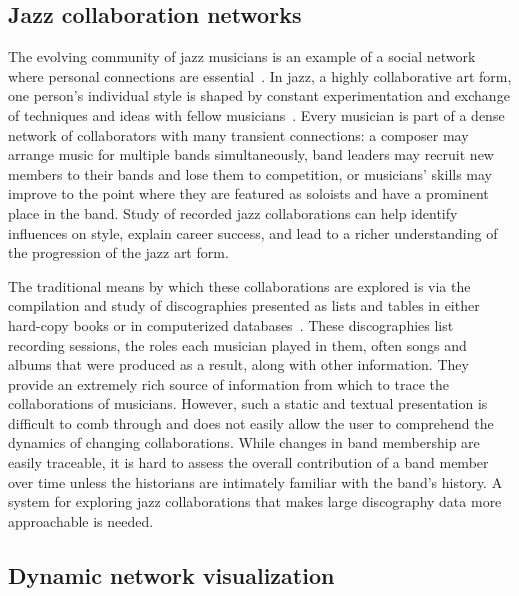 \documentclass[12pt]{cmuthesis}
\begin{document}
  \subsection{Jazz collaboration networks}

  The evolving community of jazz musicians is an example of a social network where personal connections are essential~\cite{Pinheiro2009}. In jazz, a highly collaborative art form, one person's individual style is shaped by constant experimentation and exchange of techniques and ideas with fellow musicians~\cite{Berliner1994}.  Every musician is part of a dense network of collaborators with many transient connections: a composer may arrange music for multiple bands simultaneously, band leaders may recruit new members to their bands and lose them to competition, or musicians' skills may improve to the point where they are featured as soloists and have a prominent place in the band. Study of recorded jazz collaborations can help identify influences on style, explain career success, and lead to a richer understanding of the progression of the jazz art form.

  The traditional means by which these collaborations are explored is via the compilation and study of discographies presented as lists and tables in either hard-copy books or in computerized databases~\cite{Timner2007,Albin}. These discographies list recording sessions, the roles each musician played in them, often songs and albums that were produced as a result, along with other information. They provide an extremely rich source of information from which to trace the collaborations of musicians. However, such a static and textual presentation is difficult to comb through and does not easily allow the user to comprehend the dynamics of changing collaborations. While changes in band membership are easily traceable, it is hard to assess the overall contribution of a band member over time unless the historians are intimately familiar with the band's history. A system for exploring jazz collaborations that makes large discography data more approachable is needed.

  

  \subsection{Dynamic network visualization}
\end{document}
